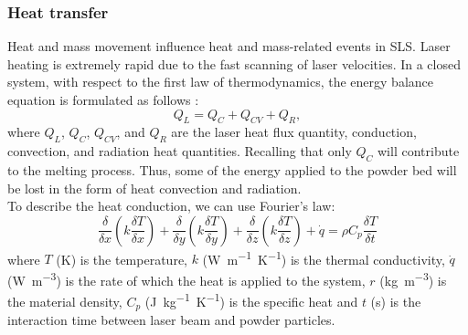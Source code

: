 \subsubsection{Heat transfer}
\label{sssec:heattransfer}
Heat and mass movement influence heat and mass-related events in SLS. Laser heating is extremely rapid due to the fast scanning of laser velocities. In a closed system, with respect to the first law of thermodynamics, the energy balance equation is formulated as follows \cite{bouabbou_understanding_2022}:
\begin{equation}
    \label{eq:tutteQ}
    Q_L = Q_C + Q_{CV} + Q_R,
\end{equation}
where $Q_L$, $Q_C$, $Q_{CV}$, and $Q_R$ are the laser heat flux quantity, conduction, convection, and radiation heat quantities. Recalling that only $Q_C$ will contribute to the melting process. Thus, some of the energy applied to the powder bed will be lost in the form of heat convection and radiation. \\
To describe the heat conduction, we can use Fourier's law:
\begin{equation}
    \frac{\delta}{\delta x}\left(k \frac{\delta T}{\delta x}\right)+\frac{\delta}{\delta y}\left(k \frac{\delta T}{\delta y}\right)+\frac{\delta}{\delta z}\left(k \frac{\delta T}{\delta z}\right)+\dot{q} =\rho C_p \frac{\delta T}{\delta t}
\end{equation}
where $T$ (\unit{\kelvin}) is the temperature, $k$ (\unit{\watt.\metre^{-1}.\kelvin^{-1}}) is the thermal conductivity, $\dot{q}$ (\unit{\watt.\metre^{-3}}) is the rate of which the heat is applied to the system, $r$ (\unit{\kilo\gram.\metre^{-3}}) is the material density, $C_p$ (\unit{\joule. \kilo\gram^{-1}.\kelvin^{-1}}) is the specific heat and $t$ (\unit{\second}) is the interaction time between laser beam and powder particles.

